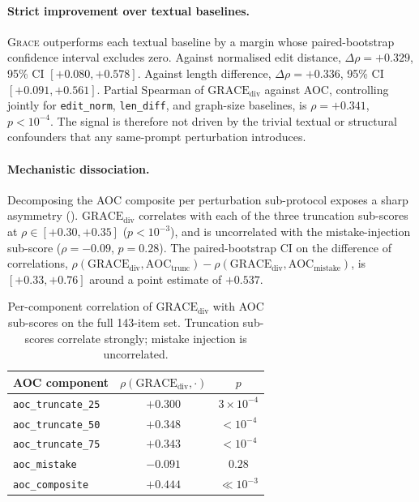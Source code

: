 \documentclass{article}
\newcommand{\GRACE}{\textsc{Grace}}
\newcommand{\gdiv}{\mathrm{GRACE}_{\text{div}}}
\begin{document}
\paragraph{Strict improvement over textual baselines.}
\GRACE{} outperforms each textual baseline by a margin whose
paired-bootstrap confidence interval excludes zero. Against normalised
edit distance, $\Delta\rho = {+}0.329$, 95\% CI $[+0.080, +0.578]$.
Against length difference, $\Delta\rho = {+}0.336$, 95\% CI
$[+0.091, +0.561]$. Partial Spearman of $\gdiv$ against AOC,
controlling jointly for \texttt{edit\_norm}, \texttt{len\_diff}, and
graph-size baselines, is $\rho = {+}0.341$, $p < 10^{-4}$. The signal
is therefore not driven by the trivial textual or structural
confounders that any same-prompt perturbation introduces.

\paragraph{Mechanistic dissociation.}
Decomposing the AOC composite per perturbation sub-protocol exposes a
sharp asymmetry (). $\gdiv$ correlates with each
of the three truncation sub-scores at $\rho \in [{+}0.30, {+}0.35]$
($p < 10^{-3}$), and is uncorrelated with the mistake-injection
sub-score ($\rho = {-}0.09$, $p = 0.28$). The paired-bootstrap CI on
the difference of correlations,
$\rho(\gdiv, \text{AOC}_{\text{trunc}}) -
 \rho(\gdiv, \text{AOC}_{\text{mistake}})$,
is $[+0.33, +0.76]$ around a point estimate of ${+}0.537$.

\begin{table}[t]
\centering\small
\caption{Per-component correlation of $\gdiv$ with AOC sub-scores on
         the full 143-item set. Truncation sub-scores correlate
         strongly; mistake injection is uncorrelated.}
\label{tab:dissociation}
\begin{tabular}{lcc}
\toprule
AOC component & $\rho(\gdiv, \cdot)$ & $p$ \\
\midrule
\texttt{aoc\_truncate\_25}     & ${+}0.300$ & $3{\times}10^{-4}$ \\
\texttt{aoc\_truncate\_50}     & ${+}0.348$ & ${<}10^{-4}$ \\
\texttt{aoc\_truncate\_75}     & ${+}0.343$ & ${<}10^{-4}$ \\
\texttt{aoc\_mistake}          & ${-}0.091$ & $0.28$ \\
\midrule
\texttt{aoc\_composite}        & ${+}0.444$ & ${\ll}10^{-3}$ \\
\bottomrule
\end{tabular}
\end{table}
\end{document}
